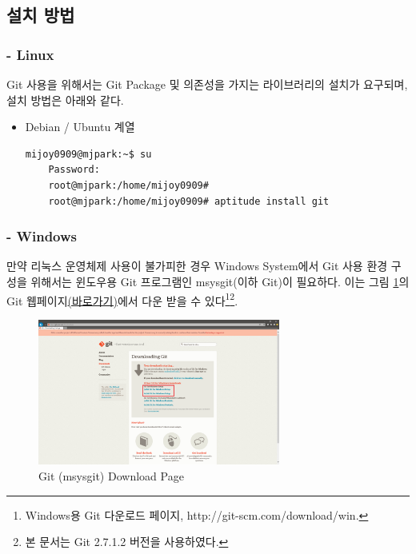 \documentclass[11pt
  , a4paper
  , article
  , oneside
]{memoir}
\begin{document}
\subsection{설치 방법}
\subsubsection{- Linux}
Git 사용을 위해서는 Git Package 및 의존성을 가지는 라이브러리의 설치가 요구되며, 설치 방법은 아래와 같다.

\begin{itemize}
\item Debian / Ubuntu 계열 
	\begin{lstlisting}[style=termstyle]	
	mijoy0909@mjpark:~$ su
	Password: 
	root@mjpark:/home/mijoy0909# 
	root@mjpark:/home/mijoy0909# aptitude install git	\end{lstlisting}	 
\end{itemize}

\subsubsection{- Windows}
만약 리눅스 운영체제 사용이 불가피한 경우 Windows System에서 Git 사용 환경 구성을 위해서는 윈도우용 Git 프로그램인 msysgit(이하 Git)이 필요하다. 이는 그림 \ref{fig:gitinstall1}의 Git 웹페이지\href{http://git-scm.com/download/win}{(바로가기)}에서 다운 받을 수 있다\footnote{Windows용 Git 다운로드 페이지, http://git-scm.com/download/win.}\footnote{본 문서는 Git 2.7.1.2 버전을 사용하였다.}.

\begin{figure}[h!]
	\centering
	\includegraphics[width=0.71\textwidth]{./images/gitinstall1.PNG}
	\caption{Git (msysgit) Download Page}
	\label{fig:gitinstall1}
\end{figure}

\clearpage
\end{document}

